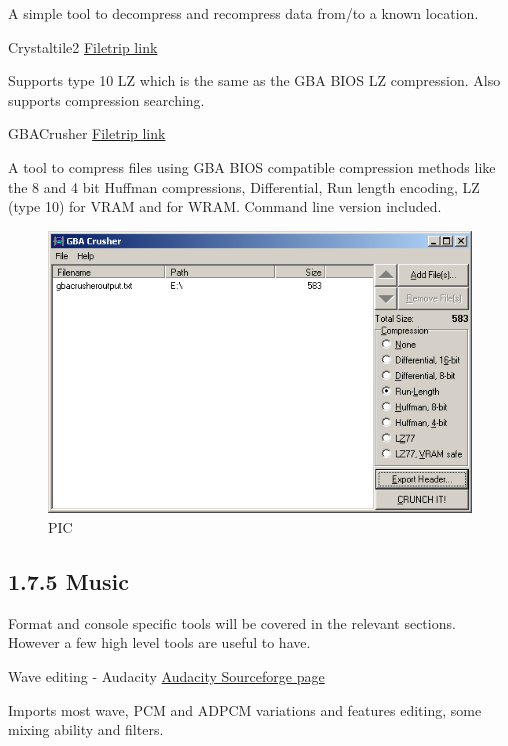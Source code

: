 \documentclass[
]{book}
\begin{document}
A simple tool to decompress and recompress data from/to a known location.

Crystaltile2 \href{http://filetrip.net/f23649-CrystalTile2-2010-09-06.html}{Filetrip link}

Supports type 10 LZ which is the same as the GBA BIOS LZ compression. Also supports compression searching.

GBACrusher \href{http://filetrip.net/gba-downloads/tools-utilities/download-gba-crusher-010-f28823.html}{Filetrip link}

A tool to compress files using GBA BIOS compatible compression methods like the 8 and 4 bit Huffman compressions, Differential, Run length encoding, LZ (type 10) for VRAM and for WRAM. Command line version included.

\begin{figure}
\centering
\includegraphics{images/16_home_fast6191_romhackingguide_unrenamed_file___hackingguidecompressionshowcasegbacrusher_1.png}
\caption{PIC}
\end{figure}

\hypertarget{music}{%
\subsection{1.7.5 Music}\label{music}}

Format and console specific tools will be covered in the relevant sections. However a few high level tools are useful to have.

Wave editing - Audacity \href{http://audacity.sourceforge.net/}{Audacity Sourceforge page}

Imports most wave, PCM and ADPCM variations and features editing, some mixing ability and filters.
\end{document}
